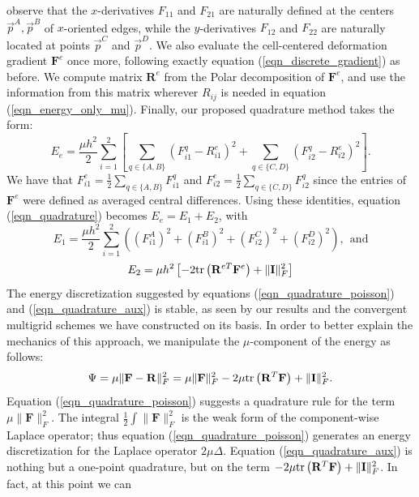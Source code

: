 observe that the $x$-derivatives $F_{11}$ and $F_{21}$ are naturally defined at the centers $\vec{p}^A,\vec{p}^B$ of $x$-oriented edges, while the $y$-derivatives $F_{12}$ and $F_{22}$
are naturally located at points $\vec{p}^C$ and $\vec{p}^D$. We also evaluate the cell-centered deformation gradient $\mathbf{F}^e$ once more, following exactly equation
(\ref{eqn_discrete_gradient}) as before. We compute matrix $\mathbf{R}^e$ from the Polar decomposition of $\mathbf{F}^e$, and use the information from this matrix wherever $R_{ij}$ is needed 
in equation (\ref{eqn_energy_only_mu}). Finally, our proposed quadrature method takes the form:
\begin{equation}
\!E_e=\frac{\mu h^2}{2}\sum_{i=1}^2\left[\sum_{q\in\{A,B\}}\!\!\!\!\left(F_{i1}^q\!-\!R_{i1}^e\right)^2+\!\!\!\!\sum_{q\in\{C,D\}}\!\!\!\!\left(F_{i2}^q\!-\!R_{i2}^e\right)^2\right].
\label{eqn_quadrature}
\end{equation}
We have that $F_{i1}^e\!=\!\frac{1}{2}\sum_{q\in\{A,B\}}F_{i1}^q$ and $F_{i2}^e\!=\!\frac{1}{2}\sum_{q\in\{C,D\}}F_{i2}^q$ since the entries of $\mathbf{F}^e$ were defined as averaged
central differences. Using these identities, equation (\ref{eqn_quadrature}) becomes $E_e=E_1+E_2$, with
\begin{equation}
E_1=\frac{\mu h^2}{2}\sum_{i=1}^2\left((F_{i1}^A)^2\!+\!(F_{i1}^B)^2\!+\!(F_{i2}^C)^2\!+\!(F_{i2}^D)^2\right),\ \ \mbox{and}
\label{eqn_quadrature_poisson}
\end{equation}
\begin{equation}
E_2=\mu h^2\left[-2\mbox{tr}\left(\mathbf{R}^{eT}\mathbf{F}^e\right)+\|\mathbf{I}\|_F^2\right]
\label{eqn_quadrature_aux}
\end{equation}
The energy discretization suggested by equations (\ref{eqn_quadrature_poisson}) and (\ref{eqn_quadrature_aux}) is stable, as seen by our results and the convergent multigrid schemes
we have constructed on its basis. In order to better explain the mechanics of this approach, we manipulate the $\mu$-component of the energy as follows:
$$
\Psi=\mu\|\mathbf{F}-\mathbf{R}\|_F^2=\mu\|\mathbf{F}\|_F^2-2\mu\mbox{tr}\left(\mathbf{R}^T\mathbf{F}\right)+\|\mathbf{I}\|_F^2.
$$
Equation (\ref{eqn_quadrature_poisson}) suggests a quadrature rule for the term $\mu\|\mathbf{F}\|_F^2$. The integral $\frac{1}{2}\int\|\mathbf{F}\|_F^2$ is the weak form of the
component-wise Laplace operator; thus equation (\ref{eqn_quadrature_poisson}) generates an energy discretization for the Laplace operator $2\mu\Delta$. Equation
(\ref{eqn_quadrature_aux}) is nothing but a one-point quadrature, but on the term $-2\mu\mbox{tr}\left(\mathbf{R}^T\mathbf{F}\right)+\|\mathbf{I}\|_F^2$. In fact, at this point we can

